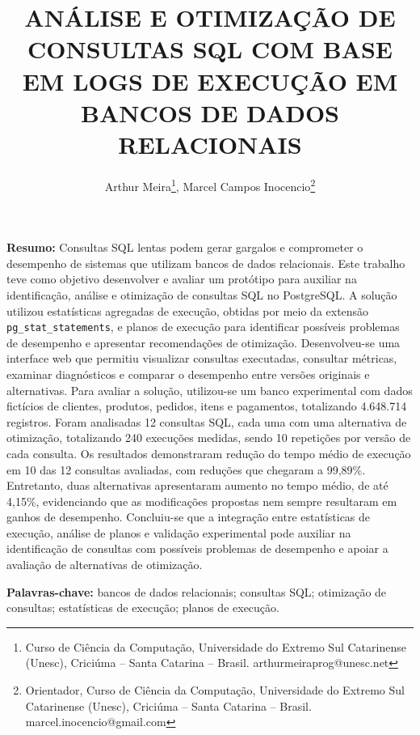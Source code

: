 \documentclass{UNESC}
\title{ANÁLISE E OTIMIZAÇÃO DE CONSULTAS SQL COM BASE EM LOGS DE EXECUÇÃO EM BANCOS DE DADOS RELACIONAIS}
\author{
Arthur Meira\footnote{
Curso de Ciência da Computação, Universidade do Extremo Sul Catarinense
(Unesc), Criciúma -- Santa Catarina -- Brasil.
arthurmeiraprog@unesc.net
},
Marcel Campos Inocencio\footnote{
Orientador, Curso de Ciência da Computação, Universidade do Extremo Sul
Catarinense (Unesc), Criciúma -- Santa Catarina -- Brasil.
marcel.inocencio@gmail.com
}
}
\begin{document}
\onehalfspacing
\maketitle


\noindent
\textbf{Resumo:}
Consultas SQL lentas podem gerar gargalos e comprometer o desempenho de sistemas que utilizam bancos de dados relacionais. Este trabalho teve como objetivo desenvolver e avaliar um protótipo para auxiliar na identificação, análise e otimização de consultas SQL no PostgreSQL. A solução utilizou estatísticas agregadas de execução, obtidas por meio da extensão \texttt{pg\_stat\_statements}, e planos de execução para identificar possíveis problemas de desempenho e apresentar recomendações de otimização. Desenvolveu-se uma interface web que permitiu visualizar consultas executadas, consultar métricas, examinar diagnósticos e comparar o desempenho entre versões originais e alternativas. Para avaliar a solução, utilizou-se um banco experimental com dados fictícios de clientes, produtos, pedidos, itens e pagamentos, totalizando 4.648.714 registros. Foram analisadas 12 consultas SQL, cada uma com uma alternativa de otimização, totalizando 240 execuções medidas, sendo 10 repetições por versão de cada consulta. Os resultados demonstraram redução do tempo médio de execução em 10 das 12 consultas avaliadas, com reduções que chegaram a 99,89\%. Entretanto, duas alternativas apresentaram aumento no tempo médio, de até 4,15\%, evidenciando que as modificações propostas nem sempre resultaram em ganhos de desempenho. Concluiu-se que a integração entre estatísticas de execução, análise de planos e validação experimental pode auxiliar na identificação de consultas com possíveis problemas de desempenho e apoiar a avaliação de alternativas de otimização.

\vspace{0.5em}
\noindent
\textbf{Palavras-chave:}
bancos de dados relacionais; consultas SQL; otimização de consultas;
estatísticas de execução; planos de execução.
\end{document}
